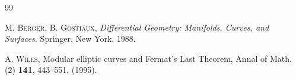 \begin{thebibliography}{99}

\makeatletter
\ifupm@en
{}
\else
{}
\fi

\textsc{M. Berger, B. Gostiaux}, 
\textit{Differential Geometry: Manifolds, Curves, and Surfaces.}
Springer, New York, 1988.

\textsc{A. Wiles}, 
Modular elliptic curves and Fermat’s Last Theorem, 
Annal of Math. (2) \textbf{141}, 443--551, (1995).

\end{thebibliography}
